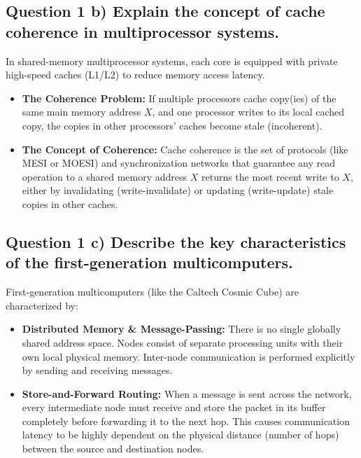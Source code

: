 \documentclass[11pt, a4paper]{article}
\begin{document}
\subsection*{Question 1 b) Explain the concept of cache coherence in multiprocessor systems.}
In shared-memory multiprocessor systems, each core is equipped with private high-speed caches (L1/L2) to reduce memory access latency.
\begin{itemize}
    \item \textbf{The Coherence Problem:} If multiple processors cache copy(ies) of the same main memory address $X$, and one processor writes to its local cached copy, the copies in other processors' caches become stale (incoherent).
    \item \textbf{The Concept of Coherence:} Cache coherence is the set of protocols (like MESI or MOESI) and synchronization networks that guarantee any read operation to a shared memory address $X$ returns the most recent write to $X$, either by invalidating (write-invalidate) or updating (write-update) stale copies in other caches.
\end{itemize}

\subsection*{Question 1 c) Describe the key characteristics of the first-generation multicomputers.}
First-generation multicomputers (like the Caltech Cosmic Cube) are characterized by:
\begin{itemize}
    \item \textbf{Distributed Memory \& Message-Passing:} There is no single globally shared address space. Nodes consist of separate processing units with their own local physical memory. Inter-node communication is performed explicitly by sending and receiving messages.
    \item \textbf{Store-and-Forward Routing:} When a message is sent across the network, every intermediate node must receive and store the packet in its buffer completely before forwarding it to the next hop. This causes communication latency to be highly dependent on the physical distance (number of hops) between the source and destination nodes.
\end{itemize}
\end{document}
